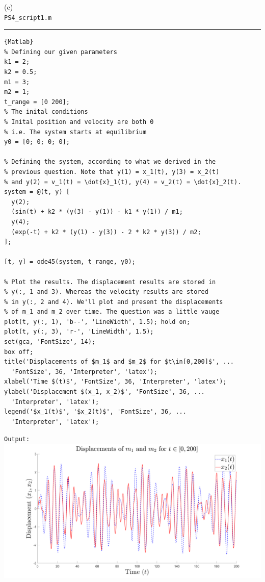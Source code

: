 \documentclass[a4paper, 11pt]{report}
\begin{document}
\sol(c) \\
\verb|PS4_script1.m| \hrule
\begin{lstlisting}{Matlab}
% Defining our given parameters
k1 = 2;
k2 = 0.5;
m1 = 3;
m2 = 1;
t_range = [0 200];
% The inital conditions
% Inital position and velocity are both 0
% i.e. The system starts at equilibrium
y0 = [0; 0; 0; 0];

% Defining the system, according to what we derived in the
% previous question. Note that y(1) = x_1(t), y(3) = x_2(t)
% and y(2) = v_1(t) = \dot{x}_1(t), y(4) = v_2(t) = \dot{x}_2(t). 
system = @(t, y) [
  y(2);
  (sin(t) + k2 * (y(3) - y(1)) - k1 * y(1)) / m1;
  y(4);
  (exp(-t) + k2 * (y(1) - y(3)) - 2 * k2 * y(3)) / m2;
];

[t, y] = ode45(system, t_range, y0);

% Plot the results. The displacement results are stored in
% y(:, 1 and 3). Whereas the velocity results are stored
% in y(:, 2 and 4). We'll plot and present the displacements
% of m_1 and m_2 over time. The question was a little vauge
plot(t, y(:, 1), 'b--', 'LineWidth', 1.5); hold on;
plot(t, y(:, 3), 'r-', 'LineWidth', 1.5);
set(gca, 'FontSize', 14);
box off;
title('Displacements of $m_1$ and $m_2$ for $t\in[0,200]$', ...
  'FontSize', 36, 'Interpreter', 'latex');
xlabel('Time $(t)$', 'FontSize', 36, 'Interpreter', 'latex');
ylabel('Displacement $(x_1, x_2)$', 'FontSize', 36, ...
  'Interpreter', 'latex');
legend('$x_1(t)$', '$x_2(t)$', 'FontSize', 36, ...
  'Interpreter', 'latex');
\end{lstlisting}
\verb|Output:|\\
\includegraphics[width=\textwidth]{./PS4_fig1.png}
\end{document}
